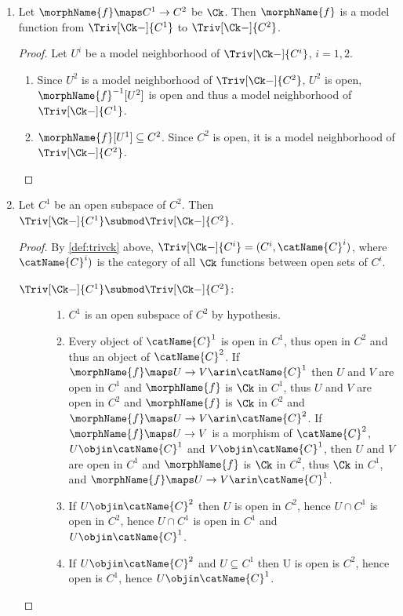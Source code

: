 \documentclass{article}
\begin{document}
\begin{lemma}
\begin{enumerate}
\item
Let $\morphName{f} \maps C^1 \to C^2$ be $\Ck$. Then $\morphName{f}$
is a model function from $\Triv[\Ck-]{C^1}$ to $\Triv[\Ck-]{C^2}$.

\begin{proof}
Let $U^i$ be a model neighborhood of $\Triv[\Ck-]{C^i}$, $i=1,2$.
\begin{enumerate}
\item
Since $U^2$ is a model neighborhood of $\Triv[\Ck-]{C^2}$, $U^2$ is open,
$\morphName{f}^{-1}[U^2]$ is open and thus a model neighborhood of
$\Triv[\Ck-]{C^1}$.
\item
$\morphName{f}[U^1] \subseteq C^2$. Since $C^2$ is open, it is a model
neighborhood of $\Triv[\Ck-]{C^2}$.
\end{enumerate}
\end{proof}

\item
Let $C^1$ be an open subspace of $C^2$. Then
$\Triv[\Ck-]{C^1} \submod \Triv[\Ck-]{C^2}$.

\begin{proof}
By \cref{def:trivck} above, $\Triv[\Ck-]{C^i} = (C^i, \catName{C}^i)$,
where $\catName{C}^i)$ is the category of all $\Ck$ functions between
open sets of $C^i$.

\begin{description}
\item[\ensuremath{\Triv[\Ck-]{C^1} \submod \Triv[\Ck-]{C^2}}:]
\mbox{}
\begin{enumerate}
\item $C^1$ is an open subspace of $C^2$ by hypothesis.

\item Every object of $\catName{C}^1$ is open in $C^1$, thus open in
$C^2$ and thus an object of $\catName{C}^2$. If
$\morphName{f} \maps U \to V \arin \catName{C}^1$ then $U$
and $V$ are open in $C^1$ and $\morphName{f}$ is $\Ck$ in $C^1$,
thus $U$ and $V$ are open in $C^2$ and $\morphName{f}$ is $\Ck$ in
$C^2$ and $\morphName{f} \maps U \to V \arin \catName{C}^2$.
If $\morphName{f} \maps U \to V$ is a morphism of
$\catName{C}^2$, $U \objin \catName{C}^1$ and
$V \objin \catName{C}^1$, then $U$ and $V$ are open in $C^1$ and
$\morphName{f}$ is $\Ck$ in $C^2$, thus $\Ck$ in $C^1$, and
$\morphName{f} \maps U \to V \arin \catName{C}^1$.

\item If $U \objin \catName{C}^2$ then $U$ is open in $C^2$, hence
$U \cap C^1$ is open in $C^2$, hence $U \cap C^1$ is open in $C^1$ and
$U \objin \catName{C}^1$.

\item If $U \objin \catName{C}^2$ and $U \subseteq C^1$ then U is open
is $C^2$, hence open is $C^1$, hence $U \objin \catName{C}^1$.
\end{enumerate}
\end{description}
\end{proof}
\end{enumerate}
\end{lemma}
\end{document}
